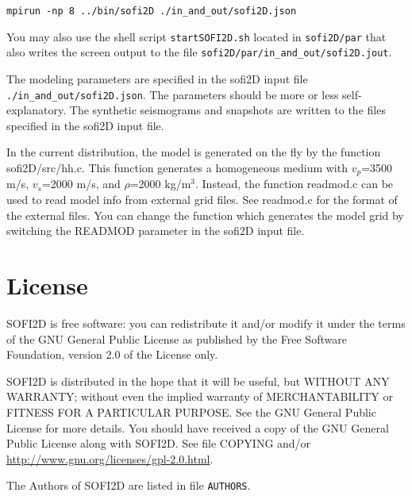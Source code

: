 \documentclass[11pt,onecolumn,oneside]{article}
\begin{document}
\texttt{mpirun -np 8 ../bin/sofi2D ./in\_and\_out/sofi2D.json}


You may also use the shell script \texttt{startSOFI2D.sh} located in \texttt{sofi2D/par} that also writes the screen output to the file \texttt{sofi2D/par/in\_and\_out/sofi2D.jout}.

The modeling parameters are specified in the sofi2D input file \texttt{./in\_and\_out/sofi2D.json}. The parameters should be more or less self-explanatory. The synthetic seismograms and snapshots are written to the files specified in the sofi2D input file.

In the current distribution, the model is generated on the fly by the function sofi2D/src/hh.c. This function generates a homogeneous medium with $v_p$=3500 m/s, $v_s$=2000 m/s, and $\rho$=2000 kg/$\mathrm{m}^3$. Instead, the function readmod.c can be used to read model info from external grid files. See readmod.c for the format of the external files. You can change the function which generates the model grid by switching the READMOD parameter in the sofi2D input file.


\section{License}\label{license}

SOFI2D is free software: you can redistribute it and/or modify it under the terms of the GNU General Public License as published by the Free Software Foundation, version 2.0 of the License only.
 
SOFI2D is distributed in the hope that it will be useful, but WITHOUT ANY WARRANTY; without even the implied warranty of MERCHANTABILITY or FITNESS FOR A PARTICULAR PURPOSE. See the GNU General Public License for more details. You should have received a copy of the GNU General Public License along with SOFI2D. See file COPYING and/or \url{http://www.gnu.org/licenses/gpl-2.0.html}.

The Authors of SOFI2D are listed in file \texttt{AUTHORS}.
\end{document}
